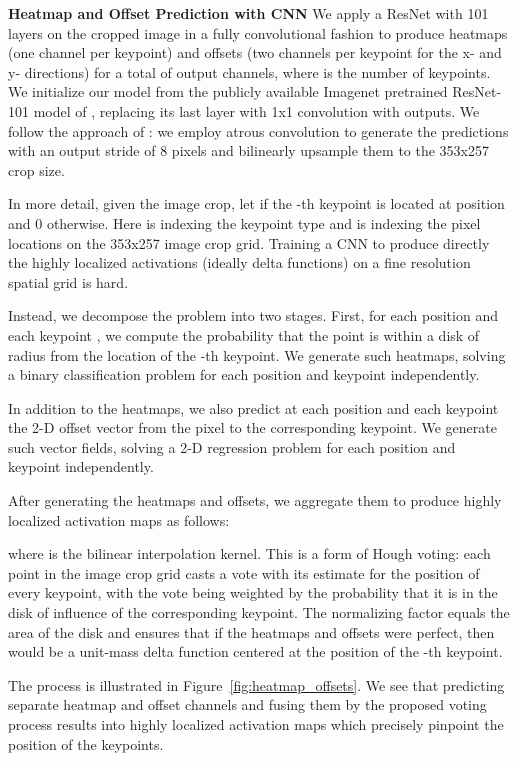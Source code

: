 \documentclass[10pt,twocolumn,letterpaper]{article}
\begin{document}
\textbf{Heatmap and Offset Prediction with CNN}
We apply a ResNet with 101 layers \cite{He2016ResNets} on the cropped image in a fully convolutional fashion to produce heatmaps (one channel per keypoint) and offsets (two channels per keypoint for the x- and y- directions) for a total of  output channels, where  is the number of keypoints. We initialize our model from the publicly available Imagenet pretrained ResNet-101 model of \cite{He2016ResNets}, replacing its last layer with 1x1 convolution with  outputs. We follow the approach of \cite{chen2016deeplab}: we employ atrous convolution to generate the  predictions with an output stride of 8 pixels and bilinearly upsample them to the 353x257 crop size.

In more detail, given the image crop, let  if the -th keypoint is located at position  and 0 otherwise. Here  is indexing the keypoint type and  is indexing the pixel locations on the 353x257 image crop grid. Training a CNN to produce directly the highly localized activations  (ideally delta functions) on a fine resolution spatial grid is hard.

Instead, we decompose the problem into two stages. First, for each position  and each keypoint , we compute the probability  that the point  is within a disk of radius  from the location  of the -th keypoint. We generate  such heatmaps, solving a binary classification problem for each position and keypoint independently.

In addition to the heatmaps, we also predict at each position  and each keypoint  the 2-D offset vector  from the pixel to the corresponding keypoint. We generate  such vector fields, solving a 2-D regression problem for each position and keypoint independently.

After generating the heatmaps and offsets, we aggregate them to produce highly localized activation maps  as follows:

where  is the bilinear interpolation kernel. This is a form of Hough voting: each point  in the image crop grid casts a vote with its estimate for the position of every keypoint, with the vote being weighted by the probability that it is in the disk of influence of the corresponding keypoint. The normalizing factor equals the area of the disk and ensures that if the heatmaps and offsets were perfect, then  would be a unit-mass delta function centered at the position of the -th keypoint.

The process is illustrated in Figure~\ref{fig:heatmap_offsets}. We see that predicting separate heatmap and offset channels and fusing them by the proposed voting process results into highly localized activation maps which precisely pinpoint the position of the keypoints.
\end{document}
